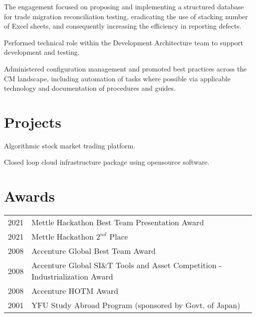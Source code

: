 \documentclass[]{cv}
\begin{document}
\begin{minipage}[t]{1.0\textwidth}
\begin{tightemize}
\item The engagement focused on proposing and implementing a structured database for trade migration reconciliation testing, eradicating the use of stacking number of Excel sheets, and consequently increasing the efficiency in reporting defects.
\end{tightemize}
\sectionsep
\sectionsep
{}
\begin{tightemize}
\item Performed technical role within the Development Architecture team to support development and testing.
\end{tightemize}
\sectionsep
\sectionsep
{}
\begin{tightemize}
\item Administered configuration management and promoted best practices across the CM landscape, including automation of tasks where possible via applicable technology and documentation of procedures and guides.
\end{tightemize}
\sectionsep

\section{Projects}\label{sec:projects}
\begin{tightemize}
\item Algorithmic stock market trading platform.
\end{tightemize}
\sectionsep
{}
\begin{tightemize}
\item Closed loop cloud infrastructure package using opensource software.
\end{tightemize}

\section{Awards}\label{sec:awards}
\begin{tabular}{rll}
2021 & Mettle Hackathon Best Team Presentation Award \\
2021 & Mettle Hackathon $2^{nd}$ Place \\
2008 & Accenture Global Best Team Award \\
2008 & Accenture Global SI\&T Tools and Asset Competition - Industrialization Award \\
2008 & Accenture HOTM Award \\
2001 & YFU Study Abroad Program (sponsored by Govt. of Japan)
\end{tabular}
\end{minipage}
\end{document}
